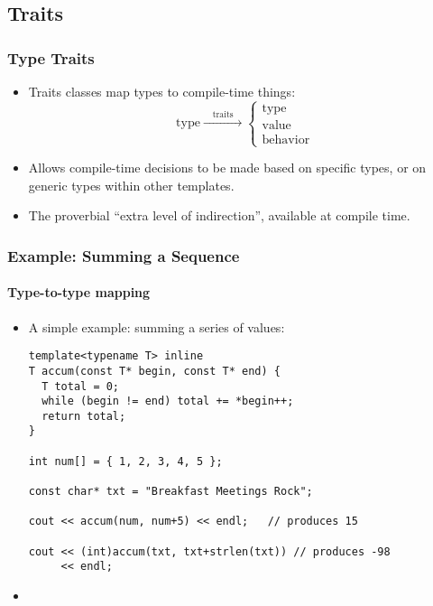 
\subsection{Traits}
\begin{frame}[fragile,t]
\frametitle{Type Traits}

\begin{itemize}[<+->]
\item Traits classes map types to compile-time things:
\[
  \mathrm{type} \xrightarrow{\quad\mathrm{traits}\quad}%
    \left\{
      \begin{matrix}
        \mathrm{type} \\
        \mathrm{value} \\
        \mathrm{behavior}
        \end{matrix}
      \right.
\]
\vskip 12pt
\item Allows compile-time decisions to be made based on specific
  types, or on generic types within other templates.

\vskip 12pt
\item The proverbial ``extra level of indirection'', available at
  compile time.

\end{itemize}

\end{frame}

\begin{frame}[fragile,t]
\frametitle{Example: Summing a Sequence}
\framesubtitle{Type-to-type mapping}

\begin{itemize}[<+->]
\item A simple example: summing a series of values:
{\scriptsize\begin{verbatim}
template<typename T> inline
T accum(const T* begin, const T* end) {
  T total = 0;
  while (begin != end) total += *begin++;
  return total;
}

int num[] = { 1, 2, 3, 4, 5 };

const char* txt = "Breakfast Meetings Rock";

cout << accum(num, num+5) << endl;   // produces 15

cout << (int)accum(txt, txt+strlen(txt)) // produces -98
     << endl;
\end{verbatim}
}
\vskip 12pt
\item {}
\end{itemize}
\end{frame}

